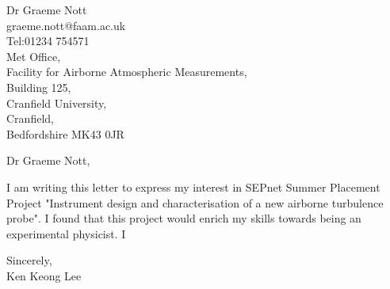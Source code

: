 \documentclass[11pt]{letter} %
\begin{document}

\begin{letter}{Dr Graeme Nott\\graeme.nott@faam.ac.uk\\Tel:01234 754571\\Met Office,\\Facility for Airborne Atmospheric Measurements,\\Building 125,\\Cranfield University,\\Cranfield,\\Bedfordshire MK43 0JR}


\opening{Dr Graeme Nott,} 

I am writing this letter to express my interest in SEPnet Summer Placement Project "Instrument design and characterisation of a new airborne turbulence probe". I found that this project would enrich my skills towards being an experimental physicist. I 


\closing{Sincerely,\\Ken Keong Lee}




\end{letter}
\end{document}
